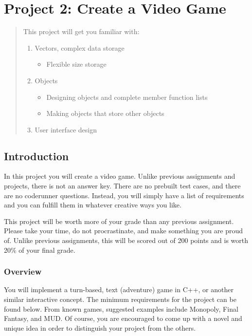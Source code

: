 \chapter*{Project 2: Create a Video Game}
\setcounter{chapter}{8}
\setcounter{section}{0}

\begin{abstract}
This project will get you familiar with:
\begin{enumerate}
    \item Vectors, complex data storage
    \begin{itemize}
        \item Flexible size storage 
    \end{itemize}
    \item Objects
    \begin{itemize}
        \item Designing objects and complete member function lists
        \item Making objects that store other objects
    \end{itemize}
    \item User interface design
\end{enumerate}
    
\end{abstract}

\section{Introduction}
In this project you will create a video game. Unlike previous assignments and projects, there is not an answer key. There are no prebuilt test cases, and there are no coderunner questions. Instead, you will simply have a list of requirements and you can fulfill them in whatever creative ways you like. 

This project will be worth more of your grade than any previous assignment. Please take your time, do not procrastinate, and make something you are proud of. Unlike previous assignments, this will be scored out of 200 points and is worth 20\% of your final grade. 

\subsection{Overview}
You will implement a turn-based, text (adventure) game in C++, or another similar interactive concept. The minimum requirements for the project can be found below. From known games, suggested examples include Monopoly, Final Fantasy, and MUD. Of course, you are encouraged to come up with a novel and unique idea in order to distinguish your project from the others.

